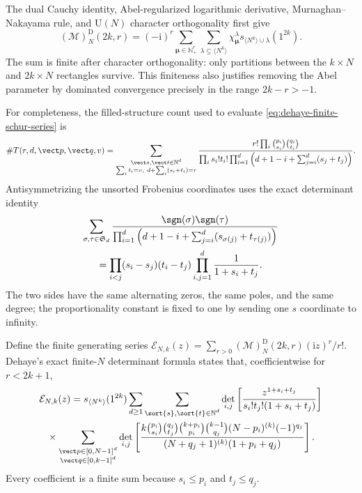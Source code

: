 The dual Cauchy identity, Abel-regularized logarithmic derivative, Murnaghan--
Nakayama rule, and $\mathrm U(N)$ character orthogonality first give
\begin{equation}
 (\mathcal M)_N^{\mathrm D}(2k,r)
 =(-\mathrm i)^r
 \sum_{\boldsymbol\mu\in\mathbb N_+^r}
 \sum_{\lambda\subseteq\langle N^k\rangle}
 \chi_{\boldsymbol\mu}^{\lambda}
 s_{\langle N^k\rangle\cup\lambda}(1^{2k}).
 \label{eq:dehaye-finite-schur-series}
\end{equation}
The sum is finite after character orthogonality: only partitions between the
$k\times N$ and $2k\times N$ rectangles survive.  This finiteness also justifies
removing the Abel parameter by dominated convergence precisely in the range
$2k-r>-1$.

For completeness, the filled-structure count used to evaluate
\eqref{eq:dehaye-finite-schur-series} is
\begin{multline}
 \#T(r,d,\vect p,\vect q,v)
 =\sum_{\substack{\vect s,\vect t\in\mathbb N^d\\
 \sum_i t_i=v,\ d+\sum_i(s_i+t_i)=r}}
 \frac{r!\prod_i\binom{p_i}{s_i}\binom{q_i}{t_i}}
 {\prod_i s_i!t_i!\prod_{i=1}^{d}
  \left(d+1-i+\sum_{j=i}^{d}(s_j+t_j)\right)}.
 \label{eq:dehaye-filled-structure-count}
\end{multline}
Antisymmetrizing the unsorted Frobenius coordinates uses the exact determinant
identity
\begin{multline}
 \sum_{\sigma,\tau\in\mathfrak S_d}
 \frac{\sgn(\sigma)\sgn(\tau)}
 {\prod_{i=1}^{d}\left(d+1-i+
  \sum_{j=i}^{d}(s_{\sigma(j)}+t_{\tau(j)})\right)}\\
 =\prod_{i<j}(s_i-s_j)(t_i-t_j)
  \prod_{i,j=1}^{d}\frac1{1+s_i+t_j}.
 \label{eq:dehaye-alternating-cauchy-identity}
\end{multline}
The two sides have the same alternating zeros, the same poles, and the same degree;
the proportionality constant is fixed to one by sending one $s$ coordinate to
infinity.

Define the finite generating series
$\mathcal E_{N,k}(z)=\sum_{r>0}(\mathcal M)_N^{\mathrm D}(2k,r)
(\mathrm iz)^r/r!$.  Dehaye's exact finite-$N$ determinant formula states that,
coefficientwise for $r<2k+1$,
\begin{multline}
 \mathcal E_{N,k}(z)=s_{\langle N^k\rangle}(1^{2k})
 \sum_{d\geq1}\sum_{\substack{\sort{s},\sort{t}\in\mathbb N^d}}
 \det_{i,j}\left[\frac{z^{1+s_i+t_j}}
 {s_i!t_j!(1+s_i+t_j)}\right]\\
 {}\times\sum_{\substack{\vect p\in[0,N-1]^d\\
 \vect q\in[0,k-1]^d}}
 \det_{i,j}\left[
 \frac{k\binom{p_i}{s_i}\binom{q_j}{t_j}
 \binom{k+p_i}{p_i}\binom{k-1}{q_j}(N-p_i)^{(k)}(-1)^{q_j}}
 {(N+q_j+1)^{(k)}(1+p_i+q_j)}
 \right].
 \label{eq:dehaye-finite-determinant-series}
\end{multline}
Every coefficient is a finite sum because $s_i\leq p_i$ and $t_j\leq q_j$.

